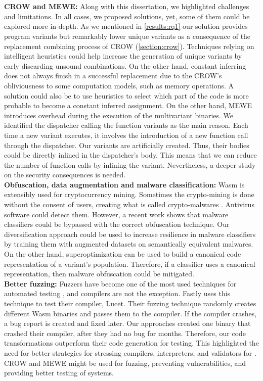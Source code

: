 \\
\\

\textbf{CROW and MEWE:} Along with this dissertation, we highlighted challenges and limitations. In all cases, we proposed solutions, yet, some of them could be explored more in-depth.
As we mentioned in \autoref{results:rq1} our solution provides program variants but remarkably lower unique variants as a consequence of the replacement combining process of CROW (\autoref{section:crow}). 
Techniques relying on intelligent heuristics could help increase the generation of unique variants by early discarding unsound combinations.
On the other hand, constant inferring does not always finish in a successful replacement due to the CROW's obliviousness to some computation models, such as memory operations. 
A solution could also be to use heuristics to select which part of the code is more probable to become a constant inferred assignment.
On the other hand, MEWE introduces overhead during the execution of the multivariant binaries.
We identified the dispatcher calling the function variants as the main reason.
Each time a new variant executes, it involves the introduction of a new function call through the dispatcher.
Our variants are artificially created. Thus, their bodies could be directly inlined in the dispatcher's body.
This means that we can reduce the number of function calls by inlining the variant.
Nevertheless, a deeper study on the security consequences is needed.
\\

\textbf{Obfuscation, data augmentation and malware classification:}
Wasm is extensibly used for cryptocurrency mining. 
Sometimes the crypto-mining is done without the consent of users, creating what is called crypto-malwares \cite{Hilbig2021AnES}.
Antivirus software could detect them. 
However, a recent work \cite{10.1145/3507657.3528560} shows that malware classifiers could be bypassed with the correct obfuscation technique.
Our diversification approach could be used to increase resilience in malware classifiers by training them with augmented datasets on semantically equivalent malwares.
On the other hand, superoptimization can be used to build a canonical code representation of a variant's population.
Therefore, if a classifier uses a canonical representation, then malware obfuscation could be mitigated.
\\

\textbf{Better fuzzing:}
Fuzzers have become one of the most used techniques for automated testing \cite{zalewski2017american}, and compilers are not the exception.
Fastly uses this technique to test their compiler, Lucet.
Their fuzzing technique randomly creates different Wasm binaries and passes them to the compiler. If the compiler crashes, a bug report is created and fixed later.
Our approaches created one binary that crashed their compiler\cite{CVE}, after they had no bug for months.
Therefore, our code transformations outperform their code generation for testing. 
This highlighted the need for better strategies for stressing compilers, interpreters, and validators for \wasm.
CROW and MEWE might be used for fuzzing, preventing vulnerabilities, and providing better testing of systems.


